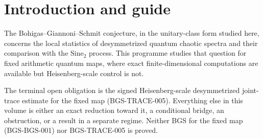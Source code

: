 \section*{Introduction and guide}
The Bohigas--Giannoni--Schmit conjecture, in the unitary-class form
studied here, concerns the local statistics of desymmetrized quantum
chaotic spectra and their comparison with the $\mathrm{Sine}_2$
process. This programme studies that question for fixed arithmetic
quantum maps, where exact finite-dimensional computations are available
but Heisenberg-scale control is not.

The terminal open obligation is the signed Heisenberg-scale
desymmetrized joint-trace estimate for the fixed map (BGS-TRACE-005).
Everything else in this volume is either an exact reduction toward it,
a conditional bridge, an obstruction, or a result in a separate regime.
Neither BGS for the fixed map (BGS-BGS-001) nor BGS-TRACE-005 is proved.

